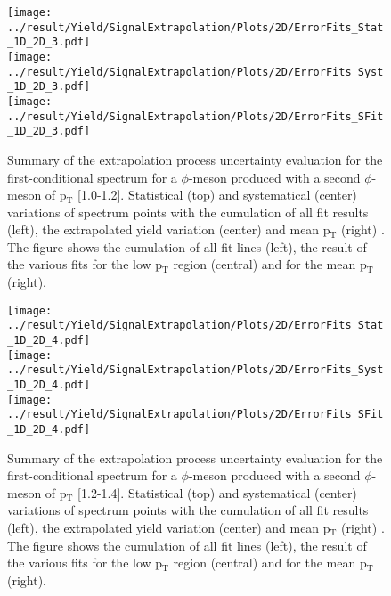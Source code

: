 \begin{figure}
\centering
\texttt{[image: ../result/Yield/SignalExtrapolation/Plots/2D/ErrorFits\_Stat\_1D\_2D\_3.pdf]}\\
\texttt{[image: ../result/Yield/SignalExtrapolation/Plots/2D/ErrorFits\_Syst\_1D\_2D\_3.pdf]}\\
\texttt{[image: ../result/Yield/SignalExtrapolation/Plots/2D/ErrorFits\_SFit\_1D\_2D\_3.pdf]}
\label{fig:Extrap2D_3}
\caption{Summary of the extrapolation process uncertainty evaluation for the first-conditional spectrum for a $\phi$-meson produced with a second $\phi$-meson of p$_{\text{T}}$ [1.0-1.2]. Statistical (top) and systematical (center) variations of spectrum points with the cumulation of all fit results (left), the extrapolated yield variation (center) and mean p$_{\text{T}}$ (right) . The figure shows the cumulation of all fit lines (left), the result of the various fits for the low p$_{\text{T}}$ region (central) and for the mean p$_{\text{T}}$ (right).}
\end{figure}

\begin{figure}
\centering
\texttt{[image: ../result/Yield/SignalExtrapolation/Plots/2D/ErrorFits\_Stat\_1D\_2D\_4.pdf]}\\
\texttt{[image: ../result/Yield/SignalExtrapolation/Plots/2D/ErrorFits\_Syst\_1D\_2D\_4.pdf]}\\
\texttt{[image: ../result/Yield/SignalExtrapolation/Plots/2D/ErrorFits\_SFit\_1D\_2D\_4.pdf]}
\label{fig:Extrap2D_4}
\caption{Summary of the extrapolation process uncertainty evaluation for the first-conditional spectrum for a $\phi$-meson produced with a second $\phi$-meson of p$_{\text{T}}$ [1.2-1.4]. Statistical (top) and systematical (center) variations of spectrum points with the cumulation of all fit results (left), the extrapolated yield variation (center) and mean p$_{\text{T}}$ (right) . The figure shows the cumulation of all fit lines (left), the result of the various fits for the low p$_{\text{T}}$ region (central) and for the mean p$_{\text{T}}$ (right).}
\end{figure}

